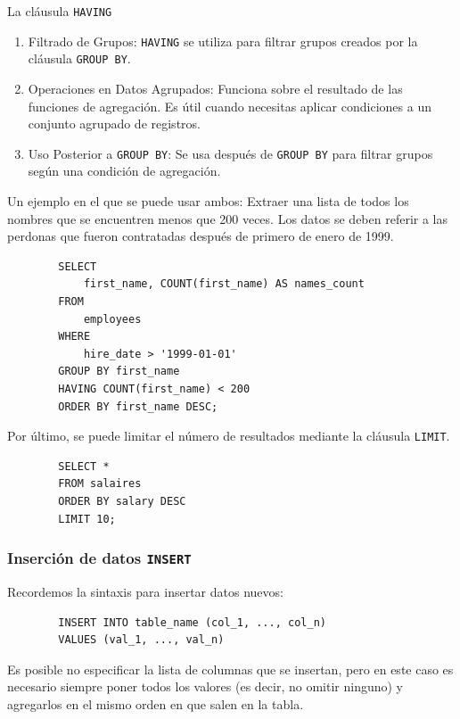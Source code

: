         La cláusula \texttt{HAVING}
        \begin{enumerate}
            \item Filtrado de Grupos: \verb|HAVING| se utiliza para filtrar grupos creados por la cláusula \verb|GROUP BY|.
            \item Operaciones en Datos Agrupados: Funciona sobre el resultado de las funciones de agregación. Es útil cuando necesitas aplicar condiciones a un conjunto agrupado de registros.
            \item Uso Posterior a \verb|GROUP BY|: Se usa después de \verb|GROUP BY| para filtrar grupos según una condición de agregación.
        \end{enumerate}

        Un ejemplo en el que se puede usar ambos: Extraer una lista de todos los nombres que se encuentren menos que 200 veces. Los datos se deben referir a las perdonas que fueron contratadas después de primero de enero de 1999.

        \begin{verbatim}
        SELECT 
            first_name, COUNT(first_name) AS names_count
        FROM
            employees
        WHERE
            hire_date > '1999-01-01'
        GROUP BY first_name
        HAVING COUNT(first_name) < 200
        ORDER BY first_name DESC;
        \end{verbatim}
        Por último, se puede limitar el número de resultados mediante la cláusula \texttt{LIMIT}.

        \begin{verbatim}
        SELECT *
        FROM salaires
        ORDER BY salary DESC
        LIMIT 10;
        \end{verbatim}
        \subsubsection{Inserción de datos \texttt{INSERT}}

        Recordemos la sintaxis para insertar datos nuevos:
        \begin{verbatim}
        INSERT INTO table_name (col_1, ..., col_n)
        VALUES (val_1, ..., val_n)
        \end{verbatim}

        Es posible no especificar la lista de columnas que se insertan, pero en este caso es necesario siempre poner todos los valores (es decir, no omitir ninguno) y agregarlos en el mismo orden en que salen en la tabla.

